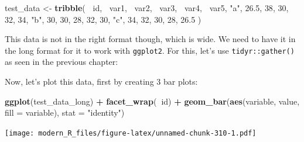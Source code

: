 \documentclass[]{gitbook}
\newenvironment{Shaded}{\begin{snugshade}}{\end{snugshade}}
\newcommand{\DataTypeTok}[1]{\textcolor[rgb]{0.13,0.29,0.53}{#1}}
\newcommand{\DecValTok}[1]{\textcolor[rgb]{0.00,0.00,0.81}{#1}}
\newcommand{\FloatTok}[1]{\textcolor[rgb]{0.00,0.00,0.81}{#1}}
\newcommand{\KeywordTok}[1]{\textcolor[rgb]{0.13,0.29,0.53}{\textbf{#1}}}
\newcommand{\NormalTok}[1]{#1}
\newcommand{\OperatorTok}[1]{\textcolor[rgb]{0.81,0.36,0.00}{\textbf{#1}}}
\newcommand{\StringTok}[1]{\textcolor[rgb]{0.31,0.60,0.02}{#1}}
\theoremstyle{definition}
\theoremstyle{definition}
\theoremstyle{definition}
\theoremstyle{remark}
\begin{document}
\begin{Shaded}
\begin{Highlighting}[]
\NormalTok{test_data <-}\StringTok{ }\KeywordTok{tribble}\NormalTok{(}
  \OperatorTok{~}\NormalTok{id, }\OperatorTok{~}\NormalTok{var1, }\OperatorTok{~}\NormalTok{var2,  }\OperatorTok{~}\NormalTok{var3, }\OperatorTok{~}\NormalTok{var4, }\OperatorTok{~}\NormalTok{var5,}
  \StringTok{"a"}\NormalTok{, }\FloatTok{26.5}\NormalTok{, }\DecValTok{38}\NormalTok{, }\DecValTok{30}\NormalTok{, }\DecValTok{32}\NormalTok{, }\DecValTok{34}\NormalTok{,}
  \StringTok{"b"}\NormalTok{, }\DecValTok{30}\NormalTok{, }\DecValTok{30}\NormalTok{, }\DecValTok{28}\NormalTok{, }\DecValTok{32}\NormalTok{, }\DecValTok{30}\NormalTok{,}
  \StringTok{"c"}\NormalTok{, }\DecValTok{34}\NormalTok{, }\DecValTok{32}\NormalTok{, }\DecValTok{30}\NormalTok{, }\DecValTok{28}\NormalTok{, }\FloatTok{26.5}
\NormalTok{)}
\end{Highlighting}
\end{Shaded}

This data is not in the right format though, which is wide. We need to
have it in the long format for it to work with \texttt{ggplot2}. For
this, let's use \texttt{tidyr::gather()} as seen in the previous
chapter:

\begin{Shaded}
\end{Shaded}

Now, let's plot this data, first by creating 3 bar plots:

\begin{Shaded}
\begin{Highlighting}[]
\KeywordTok{ggplot}\NormalTok{(test_data_long) }\OperatorTok{+}
\StringTok{  }\KeywordTok{facet_wrap}\NormalTok{(}\OperatorTok{~}\NormalTok{id) }\OperatorTok{+}
\StringTok{  }\KeywordTok{geom_bar}\NormalTok{(}\KeywordTok{aes}\NormalTok{(variable, value, }\DataTypeTok{fill =}\NormalTok{ variable), }\DataTypeTok{stat =} \StringTok{"identity"}\NormalTok{)}
\end{Highlighting}
\end{Shaded}

\texttt{[image: modern\_R\_files/figure-latex/unnamed-chunk-310-1.pdf]}
\end{document}
